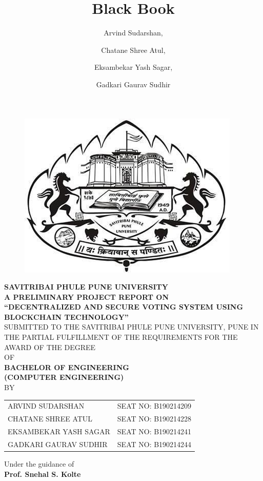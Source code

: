 \documentclass[oneside, 12pt]{book}
\title{Black Book}
\author{
  Arvind Sudarshan,
  \and
  Chatane Shree Atul,
  \and
  Eksambekar Yash Sagar,
  \and
  Gadkari Gaurav Sudhir
}
\begin{document}
	\pagestyle{plain}
	\renewcommand{\headrulewidth}{0pt}
	\titleformat{\chapter}[display]{\bfseries\centering}{\chaptertitlename}{20pt}{\Large\uppercase}

	\frontmatter

	\begin{titlepage}
		\centering
		\begin{figure}[H]
			\centering
			\includegraphics[width=0.4\linewidth]{./Resources/sppu.png}
		\end{figure}
		\textbf{SAVITRIBAI PHULE PUNE UNIVERSITY}\break
		\\\textbf{A PRELIMINARY PROJECT REPORT ON}\break
		\\{\large\textbf{“DECENTRALIZED AND SECURE VOTING SYSTEM USING BLOCKCHAIN TECHNOLOGY”}}\break
		\\SUBMITTED TO THE SAVITRIBAI PHULE PUNE UNIVERSITY, PUNE IN THE PARTIAL FULFILLMENT OF THE REQUIREMENTS FOR THE AWARD OF THE DEGREE\break
		\\OF\break
		\\{\large\textbf{BACHELOR OF ENGINEERING\\(COMPUTER ENGINEERING)}}\break
		\\BY\break
		\begin{table}[H]
			\centering
			\begin{tabular}{lr}
				ARVIND SUDARSHAN      & SEAT NO: B190214209 \\
				CHATANE SHREE ATUL    & SEAT NO: B190214228 \\
				EKSAMBEKAR YASH SAGAR & SEAT NO: B190214241 \\
				GADKARI GAURAV SUDHIR & SEAT NO: B190214244
			\end{tabular}
		\end{table}
		Under the guidance of\break
		\\\textbf{Prof. Snehal S. Kolte}\break
		\begin{figure}[H]
			\centering

\end{figure}
\end{titlepage}
\end{document}
